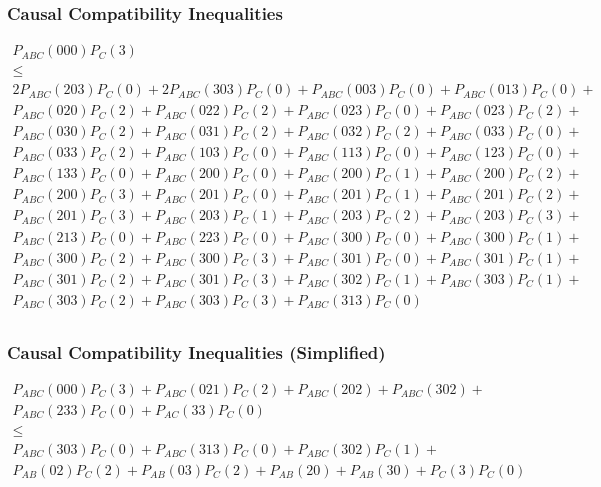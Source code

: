 \documentclass[
    hyperref={bookmarks=false},%
    xcolor={dvipsnames},
]{beamer}
\begin{document}
\begin{frame}
    \frametitle{Causal Compatibility Inequalities}
    \begin{gather*}
    P_{ABC}(000)P_{C}(3) \\
    \leq \\
    2P_{ABC}(203)P_{C}(0) + 2P_{ABC}(303)P_{C}(0) + P_{ABC}(003)P_{C}(0) + P_{ABC}(013)P_{C}(0) + \\
    P_{ABC}(020)P_{C}(2) + P_{ABC}(022)P_{C}(2) + P_{ABC}(023)P_{C}(0) + P_{ABC}(023)P_{C}(2) + \\
    P_{ABC}(030)P_{C}(2) + P_{ABC}(031)P_{C}(2) + P_{ABC}(032)P_{C}(2) + P_{ABC}(033)P_{C}(0) + \\
    P_{ABC}(033)P_{C}(2) + P_{ABC}(103)P_{C}(0) + P_{ABC}(113)P_{C}(0) + P_{ABC}(123)P_{C}(0) + \\
    P_{ABC}(133)P_{C}(0) + P_{ABC}(200)P_{C}(0) + P_{ABC}(200)P_{C}(1) + P_{ABC}(200)P_{C}(2) + \\
    P_{ABC}(200)P_{C}(3) + P_{ABC}(201)P_{C}(0) + P_{ABC}(201)P_{C}(1) + P_{ABC}(201)P_{C}(2) + \\
    P_{ABC}(201)P_{C}(3) + P_{ABC}(203)P_{C}(1) + P_{ABC}(203)P_{C}(2) + P_{ABC}(203)P_{C}(3) + \\
    P_{ABC}(213)P_{C}(0) + P_{ABC}(223)P_{C}(0) + P_{ABC}(300)P_{C}(0) + P_{ABC}(300)P_{C}(1) + \\
    P_{ABC}(300)P_{C}(2) + P_{ABC}(300)P_{C}(3) + P_{ABC}(301)P_{C}(0) + P_{ABC}(301)P_{C}(1) + \\
    P_{ABC}(301)P_{C}(2) + P_{ABC}(301)P_{C}(3) + P_{ABC}(302)P_{C}(1) + P_{ABC}(303)P_{C}(1) + \\
    P_{ABC}(303)P_{C}(2) + P_{ABC}(303)P_{C}(3) + P_{ABC}(313)P_{C}(0) \\
    \end{gather*}
\end{frame}

\begin{frame}
    \frametitle{Causal Compatibility Inequalities (Simplified)}
    \begin{gather*}
        P_{ABC}(000)P_{C}(3) + P_{ABC}(021)P_{C}(2) + P_{ABC}(202) + P_{ABC}(302) + \\
        P_{ABC}(233)P_{C}(0) + P_{AC}(33)P_{C}(0) \\
        \leq \\
        P_{ABC}(303)P_{C}(0) + P_{ABC}(313)P_{C}(0) + P_{ABC}(302)P_{C}(1) + \\
        P_{AB}(02)P_{C}(2) + P_{AB}(03)P_{C}(2) + P_{AB}(20) + P_{AB}(30) + P_{C}(3)P_{C}(0)
    \end{gather*}
\end{frame}
\end{document}
